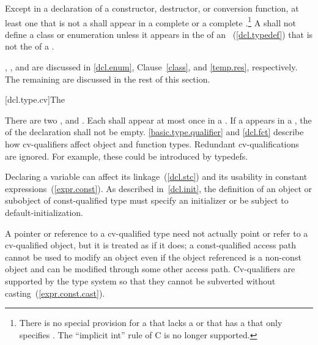 \pnum
Except in a declaration of a constructor, destructor, or conversion
function, at least one  that is not a
 shall appear in a complete
 or a complete
.\footnote{There is no special
provision for a  that
lacks a  or that has a
 that only specifies .
The ``implicit int'' rule of C is no longer supported.}
A  shall not define a class or enumeration unless
it appears in the  of an
~(\ref{dcl.typedef}) that is not the 
of a .

\pnum
\enternote
{},
,
and
are discussed
in
\ref{dcl.enum},
Clause~\ref{class},
and
\ref{temp.res}, respectively. The remaining
 are discussed in the rest of this section.
\exitnote

[dcl.type.cv]{The }%
%
%
%

\pnum
There are two ,  and
. Each  shall appear at most once in
a . If a  appears in a
, the  of
the declaration shall not be empty.
\enternote
\ref{basic.type.qualifier} and \ref{dcl.fct} describe how cv-qualifiers affect object and
function types.
\exitnote
Redundant cv-qualifications are ignored. \enternote For example,
these could be introduced by typedefs.\exitnote

\pnum
\enternote
Declaring a variable  can affect its linkage~(\ref{dcl.stc})
and its usability in constant expressions~(\ref{expr.const}). As
described in~\ref{dcl.init}, the definition of an object or subobject
of const-qualified type must specify an initializer or be subject to
default-initialization.
\exitnote

\pnum
A pointer or reference to a cv-qualified type need not actually point or
refer to a cv-qualified object, but it is treated as if it does; a
const-qualified access path cannot be used to modify an object even if
the object referenced is a non-const object and can be modified through
some other access path.
\enternote
Cv-qualifiers are supported by the type system so that they cannot be
subverted without casting~(\ref{expr.const.cast}).
\exitnote

